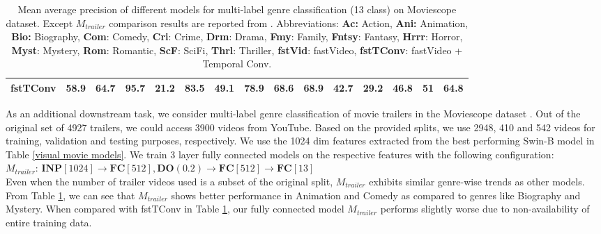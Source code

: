 \begin{table}[h!]
{\begin{tabular}{|c|c|c|c|c|c|c|c|c|c|c|c|c|c|c|}
fstTConv \cite{2019Moviescope} & 58.9             & 64.7        & 95.7         & 21.2         & 83.5         & 49.1         & 78.9         & 68.6         & 68.9           & 42.7          & 29.2          & 46.8         & 51           & 64.8          \\ \hline
\end{tabular}
}
\vspace{5mm}
\caption{Mean average precision of different models for multi-label genre classification (13 class) on Moviescope dataset. Except $M_{trailer}$ comparison results are reported from \cite{2019Moviescope}. Abbreviations: \textbf{Ac:} Action, \textbf{Ani:} Animation, \textbf{Bio:} Biography, \textbf{Com}: Comedy, \textbf{Cri}: Crime, \textbf{Drm}: Drama, \textbf{Fmy}: Family, \textbf{Fntsy}: Fantasy, \textbf{Hrrr}: Horror, \textbf{Myst}: Mystery, \textbf{Rom}: Romantic, \textbf{ScF}: SciFi, \textbf{Thrl}: Thriller, \textbf{fstVid}: fastVideo, \textbf{fstTConv}: fastVideo + Temporal Conv. }
\label{genre}
\end{table}
As an additional downstream task, we consider multi-label genre classification of movie trailers in the Moviescope dataset \cite{2019Moviescope}. Out of the original set of 4927 trailers, we could access 3900 videos from YouTube. Based on the provided splits, we use 2948, 410 and 542 videos for training, validation and testing purposes, respectively. We use the 1024 dim features extracted from the best performing Swin-B model in Table \ref{visual movie models}.
We train 3 layer fully connected models on the respective features with the following configuration:\\
\textit{$M_{trailer}$}: $\textbf{INP}[1024]\rightarrow{} \textbf{FC}[512],\textbf{DO}(0.2)\rightarrow{}\textbf{FC}[512]\rightarrow{}\textbf{FC}[13]$\\
Even when the number of trailer videos used is a subset of the original split, $M_{trailer}$ exhibits similar genre-wise trends as other models. From Table \ref{genre}, we can see that $M_{trailer}$ shows better performance in Animation and Comedy as compared to genres like Biography and Mystery. When compared with fstTConv in Table \ref{genre}, our fully connected model $M_{trailer}$ performs slightly worse due to non-availability of entire training data. 

